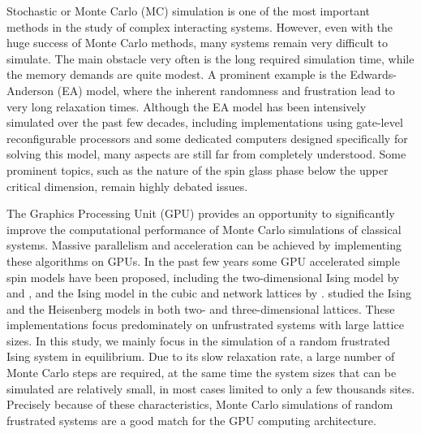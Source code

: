 Stochastic or Monte Carlo (MC) simulation is one of the most important methods in 
the study of complex interacting systems. However, even with the huge success 
of Monte Carlo methods, many systems remain very difficult to simulate. 
The main obstacle very often is the long required simulation time, while 
the memory demands are quite modest. A prominent example is the Edwards-Anderson (EA) 
model, where the inherent randomness and frustration lead to very long relaxation 
times. Although the EA model has been intensively simulated over the 
past few decades, including implementations using gate-level reconfigurable processors 
\cite{Monaghan-1993} and some dedicated computers designed specifically for solving this model, 
\cite{Ogielski-Morgenstern-1985,Ogielski-1985,Cruz-2001,Condon-Ogielski-1985,Taiji-Ito-Suzuki-1988} 
many aspects are still far from completely understood. Some prominent 
topics, such as the nature of the spin glass phase below the upper critical 
dimension, remain highly debated issues.~\cite{Jorg-Katzgraber-Krzakala-2008,Moore-2005,Young-Katzgraber-2004,Temesvari-2008,Katzgraber-2008,Sasaki-etal-2008,Sasaki-etal-2007,Larson-etal-2013,Banos2012,Katzgraber-2012,Katzgraber-Larson-Young-2009,Leuzzi-2009}

The Graphics Processing Unit (GPU) provides an opportunity to 
significantly improve the computational performance of Monte Carlo simulations 
of classical systems. Massive parallelism and acceleration can be achieved by 
implementing these algorithms on GPUs. In the past few years some GPU accelerated 
simple spin models have been proposed, including the two-dimensional Ising model 
by \citet{CSTN-093} and \citet{2010CoPhC.181.1549B}, and the Ising model in the cubic 
and network lattices by \citet{Preis:2009:GAM:1537305.1537344}.
\citet{doi:10.1142/S0129183112400025,Weigel:2012:PPS:2151219.2151631}
studied the Ising and the Heisenberg models 
in both two- and three-dimensional lattices. These implementations focus 
predominately on unfrustrated systems with large lattice sizes. In this study, we mainly 
focus in the simulation of a random frustrated Ising system in equilibrium. 
Due to its slow relaxation rate, a large number of Monte Carlo 
steps are required, at the same time the system sizes that can be simulated are 
relatively small, in most cases limited to only a few thousands sites. Precisely 
because of these characteristics, Monte Carlo simulations of random frustrated 
systems are a good match for the GPU computing architecture.

